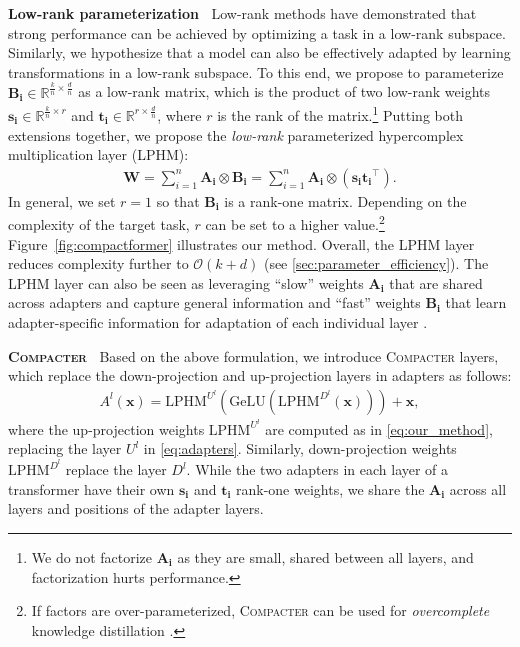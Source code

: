 \documentclass{article}
\newcommand{\compacter}{\textsc{Compacter}\xspace}
\begin{document}
\noindent \textbf{Low-rank parameterization} $\:$ Low-rank methods \citep{li2018measuring,aghajanyan2020intrinsic} have demonstrated that strong performance can be achieved by optimizing a task in a low-rank subspace. Similarly, we hypothesize that a model can also be effectively adapted by learning transformations in a low-rank subspace.
To this end, we propose to parameterize $\bm{B_i}\in\mathbb{R}^{\frac{k}{n}\times \frac{d}{n}}$ as a low-rank matrix, which is the product of two low-rank weights $\bm{s_i} \in \mathbb{R}^{\frac{k}{n}\times r}$ and $\bm{t_i}\in \mathbb{R}^{r \times {\frac{d}{n}}}$, where $r$ is the rank of the matrix.\footnote{We do not factorize $\bm{A_i}$ as they are small, shared between all layers, and factorization hurts performance.} Putting both extensions together, we propose the \emph{low-rank} parameterized hypercomplex multiplication layer (LPHM):
\begin{align}
\bm{W} = \sum_{i=1}^n \bm{A_i} \otimes \bm{B_i} = \sum_{i=1}^n \bm{A_i} \otimes (\bm{s_i}\bm{t_i}^\top).
\label{eq:our_method}
\end{align} 
In general, we set $r=1$ so that $\bm{B_i}$ is a rank-one matrix. Depending on the complexity of the target task, $r$ can be set to a higher value.\footnote{If factors are over-parameterized, \compacter can be used for \emph{overcomplete} knowledge distillation \citep{arora2018optimization}.} Figure~\ref{fig:compactformer} illustrates our method. Overall, the LPHM layer reduces complexity further to $\mathcal{O}(k+d)$ (see \textsection \ref{sec:parameter_efficiency}).
The LPHM layer can also be seen as leveraging ``slow'' weights $\bm{A_i}$ that are shared across adapters and capture general information and ``fast'' weights $\bm{B_i}$ that learn adapter-specific information for adaptation of each individual layer \citep{Wen2020batchensemble}.


\noindent \textbf{\compacter} $\:$ \label{sec:phm-adapters}
Based on the above formulation, we introduce \compacter layers, which replace the down-projection and up-projection layers in adapters as follows:
\begin{align}
A^l(\bm{x}) =\text{LPHM}^{U^l}(\text{GeLU}(\text{LPHM}^{D^l}(\bm{x}))) + \bm{x}, \nonumber
\end{align} where the up-projection weights $\text{LPHM}^{U^l}$ are computed as in \eqref{eq:our_method}, replacing the layer $U^l$ in \eqref{eq:adapters}. Similarly, down-projection weights $\text{LPHM}^{D^l}$ replace the layer $D^l$. While the two adapters in each layer of a transformer have their own $\bm{s_i}$ and $\bm{t_i}$ rank-one weights, we share the $\bm{A_i}$ across all layers and positions of the adapter layers.
\vspace{-0.4em}
\end{document}

